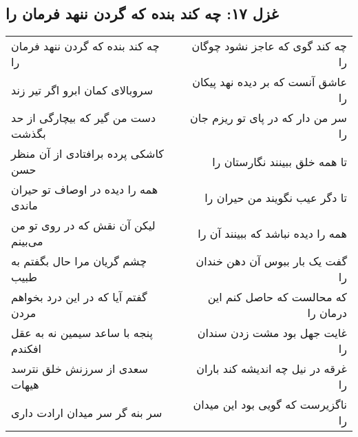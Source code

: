 \begin{center}
\section*{غزل ۱۷: چه کند بنده که گردن ننهد فرمان را}
\label{sec:017}
\begin{longtable}{l p{0.5cm} r}
چه کند بنده که گردن ننهد فرمان را
&&
چه کند گوی که عاجز نشود چوگان را
\\
سروبالای کمان ابرو اگر تیر زند
&&
عاشق آنست که بر دیده نهد پیکان را
\\
دست من گیر که بیچارگی از حد بگذشت
&&
سر من دار که در پای تو ریزم جان را
\\
کاشکی پرده برافتادی از آن منظر حسن
&&
تا همه خلق ببینند نگارستان را
\\
همه را دیده در اوصاف تو حیران ماندی
&&
تا دگر عیب نگویند من حیران را
\\
لیکن آن نقش که در روی تو من می‌بینم
&&
همه را دیده نباشد که ببینند آن را
\\
چشم گریان مرا حال بگفتم به طبیب
&&
گفت یک بار ببوس آن دهن خندان را
\\
گفتم آیا که در این درد بخواهم مردن
&&
که محالست که حاصل کنم این درمان را
\\
پنجه با ساعد سیمین نه به عقل افکندم
&&
غایت جهل بود مشت زدن سندان را
\\
سعدی از سرزنش خلق نترسد هیهات
&&
غرقه در نیل چه اندیشه کند باران را
\\
سر بنه گر سر میدان ارادت داری
&&
ناگزیرست که گویی بود این میدان را
\\
\end{longtable}
\end{center}
